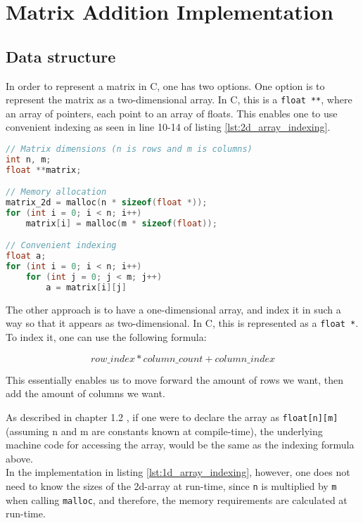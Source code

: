 \section{Matrix Addition Implementation}

\subsection{Data structure}

In order to represent a matrix in C, one has two options. One option is to represent the matrix as a two-dimensional array. In C, this is a \texttt{float **}, where an array of pointers, each point to an array of floats. This enables one to use convenient indexing as seen in line 10-14 of listing \ref{lst:2d_array_indexing}.

\begin{lstlisting}[language=C, caption={Allocation and indexing of a float **}, label={lst:2d_array_indexing}]
// Matrix dimensions (n is rows and m is columns)
int n, m;
float **matrix;

// Memory allocation
matrix_2d = malloc(n * sizeof(float *));
for (int i = 0; i < n; i++)
    matrix[i] = malloc(m * sizeof(float));

// Convenient indexing
float a;
for (int i = 0; i < n; i++)
    for (int j = 0; j < m; j++)
        a = matrix[i][j]
\end{lstlisting}

The other approach is to have a one-dimensional array, and index it in such a way so that it appears as two-dimensional. In C, this is represented as a \texttt{float *}. To index it, one can use the following formula: 

\[row\_index * column\_count + column\_index\]

This essentially enables us to move forward the amount of rows we want, then add the amount of columns we want.

As described in chapter 1.2 \cite{numericalrecipes}, if one were to declare the array as \texttt{float[n][m]} (assuming n and m are constants known at compile-time), the underlying machine code for accessing the array, would be the same as the indexing formula above.\\

\noindent In the implementation in listing \ref{lst:1d_array_indexing}, however, one does not need to know the sizes of the 2d-array at run-time, since \texttt{n} is multiplied by \texttt{m} when calling \texttt{malloc}, and therefore, the memory requirements are calculated at run-time.

